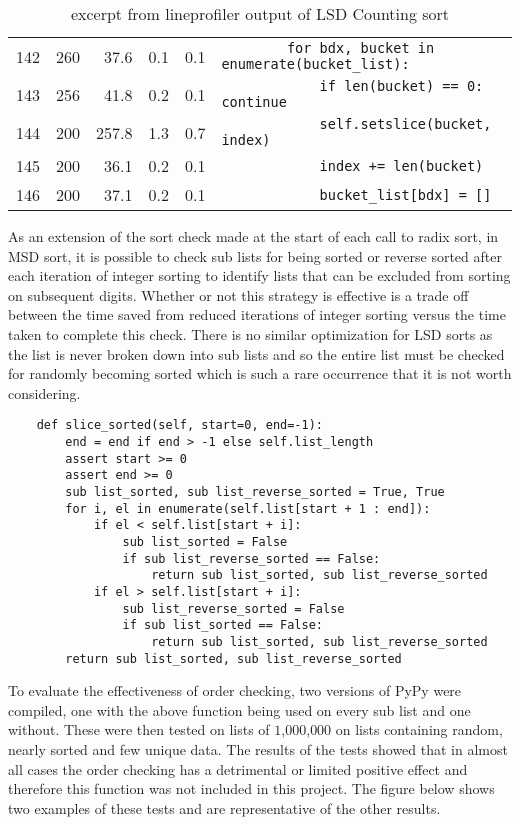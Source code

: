 \documentclass[12pt]{article}
\begin{document}
\begin{table}[H]
{{\begin{tabular}{rrrrrl}
	 142 & 260   & 37.6   & 0.1    & 0.1  &  \;\;\;\;\;\;\;\;\lstinline{        for bdx, bucket in enumerate(bucket_list):}\\
	 143 & 256   & 41.8   & 0.2    & 0.1  &  \;\;\;\;\;\;\;\;\;\;\;\;\lstinline{            if len(bucket) == 0: continue}\\
	 144 & 200   & 257.8  & 1.3    & 0.7  &  \;\;\;\;\;\;\;\;\;\;\;\;\lstinline{            self.setslice(bucket, index)}\\
	 145 & 200   & 36.1   & 0.2    & 0.1  &  \;\;\;\;\;\;\;\;\;\;\;\;\lstinline{            index += len(bucket)}\\
	 146 & 200   & 37.1   & 0.2    & 0.1  &  \;\;\;\;\;\;\;\;\;\;\;\;\lstinline{            bucket_list[bdx] = []}\\
	 \hline
		\end{tabular}
		}}
		\caption{excerpt from line\textunderscore profiler output of LSD Counting sort}
	\end{table}
\pagebreak
{}
\label{sssec:orderchecking}
As an extension of the sort check made at the start of each call to radix sort, in MSD sort, it is possible to check sub lists for being sorted or reverse sorted after each iteration of integer sorting to identify lists that can be excluded from sorting on subsequent digits. Whether or not this strategy is effective is a trade off between the time saved from reduced iterations of integer sorting versus the time taken to complete this check. There is no similar optimization for LSD sorts as the list is never broken down into sub lists and so the entire list must be checked for randomly becoming sorted which is such a rare occurrence that it is not worth considering.
\par
\begin{lstlisting}	
	def slice_sorted(self, start=0, end=-1):
		end = end if end > -1 else self.list_length
		assert start >= 0
		assert end >= 0
		sub list_sorted, sub list_reverse_sorted = True, True
		for i, el in enumerate(self.list[start + 1 : end]):
			if el < self.list[start + i]:
				sub list_sorted = False
				if sub list_reverse_sorted == False:
					return sub list_sorted, sub list_reverse_sorted
			if el > self.list[start + i]:
				sub list_reverse_sorted = False
				if sub list_sorted == False:
					return sub list_sorted, sub list_reverse_sorted
		return sub list_sorted, sub list_reverse_sorted
\end{lstlisting}
\par
To evaluate the effectiveness of order checking, two versions of PyPy were compiled, one with the above function being used on every sub list and one without. These were then tested on lists of $1$,$000$,$000$ on lists containing random, nearly sorted and few unique data. The results of the tests showed that in almost all cases the order checking has a detrimental or limited positive effect and therefore this function was not included in this project. The figure below shows two examples of these tests and are representative of the other results.
\end{document}
